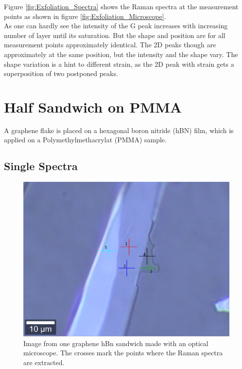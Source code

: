 \documentclass[%
 reprint,
amsmath,amssymb,
pra,
]{revtex4-1}
\begin{document}
Figure \ref{fig:Exfoliation_Spectra} shows the Raman spectra at the measurement points as shown in figure \ref{fig:Exfoliation_Microscope}. \\
As one can hardly see the intensity of the G peak increases with increasing number of layer until its saturation. But the shape and position are for all measurement points approximately identical. The 2D peaks though are approximately at the same position, but the intensity and the shape vary. The shape variation is a hint to different strain, as the 2D peak with strain gets a superposition of two postponed peaks. 



\section{Half Sandwich on PMMA}
A graphene flake is placed on a hexagonal boron nitride (hBN) film, which is applied on a Polymethylmethacrylat (PMMA) sample. 

\subsection{Single Spectra}

\begin{figure}
\centering
\includegraphics[scale=0.25]{Bilder/Part_2/4_Half_sandwich_on_PMMA.PNG}
\caption{Image from one graphene hBn sandwich made with an optical microscope. The crosses mark the points where the Raman spectra are extracted.}
\label{fig:Part2_map_microscope}
\end{figure}
\end{document}
